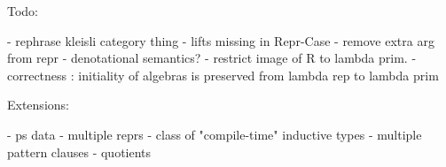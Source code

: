 Todo:

- rephrase kleisli category thing
- lifts missing in Repr-Case
- remove extra arg from repr
- denotational semantics?
- restrict image of R to lambda prim.
- correctness : initiality of algebras is preserved from lambda rep to lambda prim

Extensions:

- ps data
- multiple reprs
- class of "compile-time" inductive types
- multiple pattern clauses
- quotients
